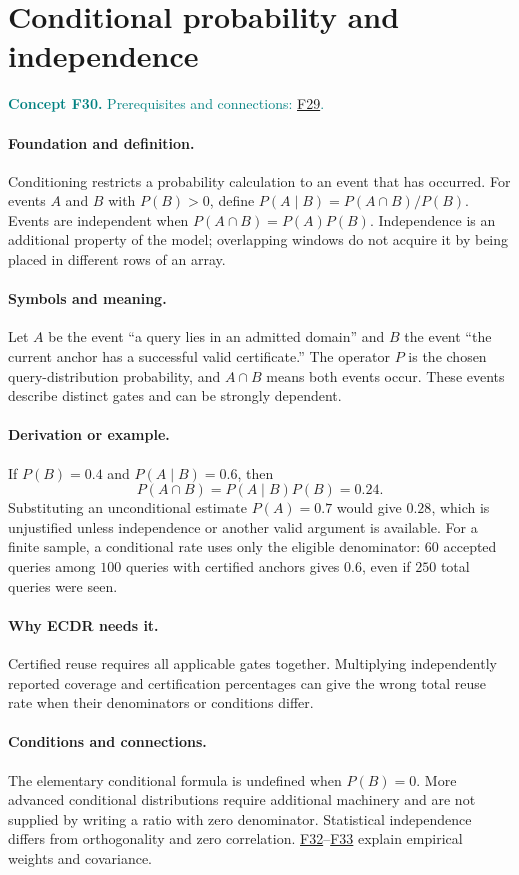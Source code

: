 \documentclass[11pt,a4paper]{article}
\newcommand{\conceptid}{Front matter}
\newcommand{\concept}[3]{\clearpage\renewcommand{\conceptid}{#1}%
\section{#2}\label{concept:#1}%
\textcolor{teal}{\textbf{Concept #1.} Prerequisites and connections: #3.}\par
\typeout{ECDR-CONCEPT-START #1 PAGE=\thepage}}
\begin{document}
\concept{F30}{Conditional probability and independence}{\hyperref[concept:F29]{F29}}
\paragraph{Foundation and definition.}
Conditioning restricts a probability calculation to an event that has
occurred. For events $A$ and $B$ with $P(B)>0$, define
$P(A\mid B)=P(A\cap B)/P(B)$. Events are independent when
$P(A\cap B)=P(A)P(B)$. Independence is an additional property of
the model; overlapping windows do not acquire it by being placed in
different rows of an array.
\paragraph{Symbols and meaning.}
Let $A$ be the event ``a query lies in an admitted domain'' and $B$ the
event ``the current anchor has a successful valid certificate.''
The operator $P$ is the chosen query-distribution probability, and
$A\cap B$ means both events occur. These events describe distinct
gates and can be strongly dependent.
\paragraph{Derivation or example.}
If $P(B)=0.4$ and $P(A\mid B)=0.6$, then
\[
 P(A\cap B)=P(A\mid B)P(B)=0.24.
\]
Substituting an unconditional estimate $P(A)=0.7$ would give $0.28$,
which is unjustified unless independence or another valid argument is
available. For a finite sample, a conditional rate uses only the
eligible denominator: $60$ accepted queries among $100$ queries with
certified anchors gives $0.6$, even if $250$ total queries were seen.
\paragraph{Why ECDR needs it.}
Certified reuse requires all applicable gates together. Multiplying
independently reported coverage and certification percentages can give
the wrong total reuse rate when their denominators or conditions differ.
\paragraph{Conditions and connections.}
The elementary conditional formula is undefined when $P(B)=0$.
More advanced conditional distributions require additional machinery
and are not supplied by writing a ratio with zero denominator.
Statistical independence differs from orthogonality and zero
correlation. \hyperref[concept:F32]{F32}--\hyperref[concept:F33]{F33} explain empirical weights and covariance.
\par\label{endconcept:F30}
\end{document}
